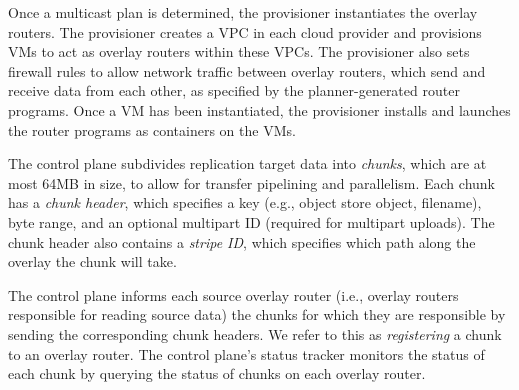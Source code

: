 Once a multicast plan is determined, the provisioner instantiates the overlay routers.
The provisioner creates a VPC in each cloud provider and provisions VMs to act as overlay routers within these VPCs.
The provisioner also sets firewall rules to allow network traffic between overlay routers, which send and receive data from each other, as specified by the planner-generated router programs. 
Once a VM has been instantiated, the provisioner
installs and launches the router programs as containers on the VMs.

The control plane subdivides replication target data into \textit{chunks}, which are at most 64MB in size, to allow for transfer pipelining and parallelism.
Each chunk has a \textit{chunk header}, which specifies a key (e.g., object store object, filename), byte range, and an optional multipart ID (required for multipart uploads).
The chunk header also contains a \textit{stripe ID}, which specifies which path along the overlay the chunk will take. 

The control plane informs each source overlay router (i.e., overlay routers responsible for reading source data) the chunks for which they are responsible by sending the corresponding chunk headers.
We refer to this as \textit{registering} a chunk to an overlay router. 
The control plane's status tracker monitors the status of each chunk by querying the status of chunks on each overlay router. 



